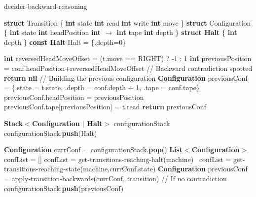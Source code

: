 \begin{algorithm}
  \caption{{\sc decider-backward-reasoning}}\label{alg:backward-reasoning}

  \begin{algorithmic}[1]
    \State \textbf{struct} Transition \{
      \State \tabi\textbf{int} state
      \State \tabi\textbf{int} read
      \State \tabi\textbf{int} write
      \State \tabi\textbf{int} move
      \State \}
          \State \textbf{struct} Configuration \{
          \State \tabi\textbf{int} state
          \State \tabi\textbf{int} headPosition
          \State \tabi\textbf{int $\boldsymbol{\to}$ int} tape
          \State \tabi\textbf{int} depth
          \State \}
          \State \textbf{struct Halt} \{ \textbf{int} depth \}
          \State \textbf{const Halt} Halt = \{.depth=0\}
          \State
          
          \State \textbf{int} reversedHeadMoveOffset = (t.move == RIGHT) ? -1 : 1
          \State \textbf{int} previousPosition = conf.headPosition+reversedHeadMoveOffset
          \State // Backward contradiction spotted
          \State \textbf{return} \textbf{nil}
          \EndIf
          \State // Building the previous configuration
          \State \textbf{Configuration} previousConf = \{.state = t.state, .depth = conf.depth + 1, .tape = conf.tape\}
          \State previousConf.headPosition = previousPosition
          \State previousConf.tape[previousPosition] = t.read
          \State \textbf{return} previousConf
          \EndProcedure
          
          \State \textbf{Stack$\boldsymbol{<}$Configuration $|$ Halt$\boldsymbol{>}$} configurationStack
          \State configurationStack.\textbf{push}(Halt)

          \State \textbf{Configuration} currConf = configurationStack.\textbf{pop}()
          \State \textbf{List$\boldsymbol{<}$Configuration$\boldsymbol{>}$} confList = []
          confList = {\sc get-transitions-reaching-halt}(machine)
          \Else \ confList = {\sc get-transitions-reaching-state}(machine,currConf.state)
          \EndIf
          \State \textbf{Configuration} previousConf = {\sc apply-transition-backwards}(currConf, transition)
          \State // If no contradiction
          \State configurationStack.\textbf{push}(previousConf)
          \EndIf
          \EndFor
          \EndWhile


\end{algorithmic}
\end{algorithm}
